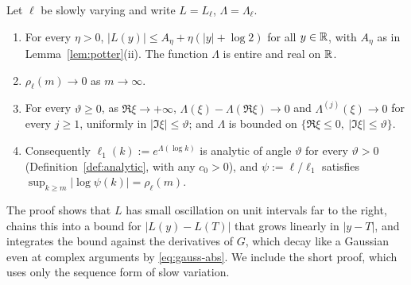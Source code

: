 \begin{lemma}\label{lem:smoothing}
Let $\ell$ be slowly varying and write $L=L_\ell$, $\Lambda=\Lambda_\ell$.
\begin{enumerate}
\item[\textup{(o)}] For every $\eta>0$, $|L(y)|\le A_\eta+\eta(|y|+\log2)$ for all $y\in\mathbb{R}$, with $A_\eta$ as in
  Lemma~\ref{lem:potter}(ii). The function $\Lambda$ is entire and real on $\mathbb{R}$.
\item[\textup{(i)}] $\rho_\ell(m)\to0$ as $m\to\infty$.
\item[\textup{(ii)}] For every $\vartheta\ge0$, as $\Re\xi\to+\infty$, $\Lambda(\xi)-\Lambda(\Re\xi)\to0$ and
  $\Lambda^{(j)}(\xi)\to0$ for every $j\ge1$, uniformly in $|\Im\xi|\le\vartheta$; and $\Lambda$ is bounded on
  $\{\Re\xi\le0,\ |\Im\xi|\le\vartheta\}$.
\item[\textup{(iii)}] Consequently $\ell_1(k):=e^{\Lambda(\log k)}$ is analytic of angle $\vartheta$ for every
  $\vartheta>0$ \textup{(}Definition~\ref{def:analytic}, with any $c_0>0$\textup{)}, and $\psi:=\ell/\ell_1$ satisfies
  $\sup_{k\ge m}|\log\psi(k)|=\rho_\ell(m)$.
\end{enumerate}
\end{lemma}

The proof shows that $L$ has small oscillation on unit intervals far to the right, chains this into a bound for
$|L(y)-L(T)|$ that grows linearly in $|y-T|$, and integrates the bound against the derivatives of $G$, which decay
like a Gaussian even at complex arguments by \eqref{eq:gauss-abs}. We include the short proof, which uses only the
sequence form of slow variation.

